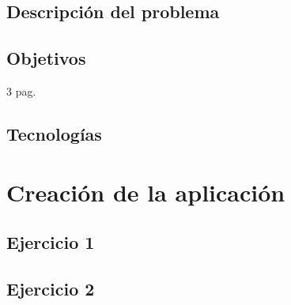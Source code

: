 \documentclass[a4paper, 12pt]{article}
\begin{document}
\subsection{Descripción del problema}

\subsection{Objetivos}
3 pag.
\subsection{Tecnologías}


\section{Creación de la aplicación}
\subsection{Ejercicio 1}

\subsection{Ejercicio 2}
\end{document}
